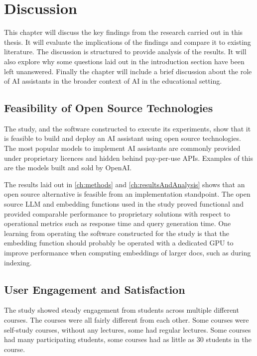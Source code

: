 ﻿\chapter{Discussion}
\label{ch:discussion}


This chapter will discuss the key findings from the research carried out in this thesis. It will evaluate the implications of the findings and compare it to existing literature. The discussion is structured to provide analysis of the results. It will also explore why some questions laid out in the introduction section have been left unanswered. Finally the chapter will include a brief discussion about the role of AI assistants in the broader context of AI in the educational setting.




\section{Feasibility of Open Source Technologies}


The study, and the software constructed to execute its experiments, show that it is feasible to build and deploy an AI assistant using open source technologies. The most popular models to implement AI assistants are commonly provided under proprietary licences and hidden behind pay-per-use APIs. Examples of this are the models built and sold by OpenAI.


The results laid out in \autoref{ch:methods} and \autoref{ch:resultsAndAnalysis} shows that an open source alternative is feasible from an implementation standpoint. The open source \gls{LLM} and embedding functions used in the study proved functional and provided comparable performance to proprietary solutions with respect to operational metrics such as response time and query generation time. One learning from operating the software constructed for the study is that the embedding function should probably be operated with a dedicated GPU to improve performance when computing embeddings of larger docs, such as during indexing.


\section{User Engagement and Satisfaction}


The study showed steady engagement from students across multiple different courses. The courses were all fairly different from each other. Some courses were self-study courses, without any lectures, some had regular lectures. Some courses had many participating students, some courses had as little as 30 students in the course.



